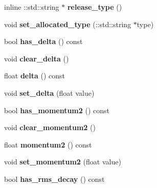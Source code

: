 \begin{DoxyCompactItemize}
inline \+::std\+::string $\ast$ {\bfseries release\+\_\+type} ()
\item 
\mbox{\label{classcaffe_1_1_solver_parameter_a53699fd4accd63d6033e05cf58e74b6e}} 
void {\bfseries set\+\_\+allocated\+\_\+type} (\+::std\+::string $\ast$type)
\item 
\mbox{\label{classcaffe_1_1_solver_parameter_aa5806d2485779fd09db665e728fed2f8}} 
bool {\bfseries has\+\_\+delta} () const
\item 
\mbox{\label{classcaffe_1_1_solver_parameter_a8159fe04ec2d7de3218f66d4ea008a1c}} 
void {\bfseries clear\+\_\+delta} ()
\item 
\mbox{\label{classcaffe_1_1_solver_parameter_ac3377e3a28cfd382f78b1031e8943158}} 
float {\bfseries delta} () const
\item 
\mbox{\label{classcaffe_1_1_solver_parameter_a565ae59fb9e0a9c8b4f9eea4df2b6261}} 
void {\bfseries set\+\_\+delta} (float value)
\item 
\mbox{\label{classcaffe_1_1_solver_parameter_a9a2446b16548855d32e5fb0bc316e5b5}} 
bool {\bfseries has\+\_\+momentum2} () const
\item 
\mbox{\label{classcaffe_1_1_solver_parameter_aef7e1e2167462515a98740b4aa19f595}} 
void {\bfseries clear\+\_\+momentum2} ()
\item 
\mbox{\label{classcaffe_1_1_solver_parameter_aea8a2cbc98bcf5fdbfdaa8476b8555ce}} 
float {\bfseries momentum2} () const
\item 
\mbox{\label{classcaffe_1_1_solver_parameter_a236abf10a5fb7f1510aad2f575e6f2ab}} 
void {\bfseries set\+\_\+momentum2} (float value)
\item 
\mbox{\label{classcaffe_1_1_solver_parameter_ad55a6c125026b46db89c3385560a3b9c}} 
bool {\bfseries has\+\_\+rms\+\_\+decay} () const

\end{DoxyCompactItemize}
